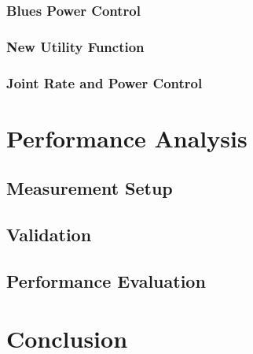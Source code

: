 \documentclass{sig-alternate}
\begin{document}
	\subsubsection{Blues Power Control}
	\label{s:blues}

	\subsubsection{New Utility Function}
	\label{s:utility}

	\subsubsection{Joint Rate and Power Control}
	\label{s:joint-control}







	\section{Performance Analysis}
	\label{s:measurements}

	\subsection{Measurement Setup}

	\subsection{Validation}

	\subsection{Performance Evaluation}


	\section{Conclusion}
	\label{s:conclusion}


	{
	
	\small
	
	}

\end{document}
